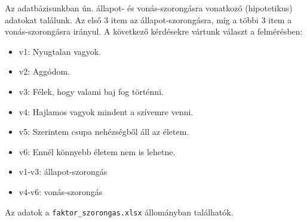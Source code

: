 \documentclass[
  letterpaper,
]{krantz}
\makeatletter
\newenvironment{Shaded}{\begin{snugshade}}{\end{snugshade}}
\newcommand{\CommentTok}[1]{\textcolor[rgb]{0.37,0.37,0.37}{#1}}
\newcommand{\FunctionTok}[1]{\textcolor[rgb]{0.28,0.35,0.67}{#1}}
\newcommand{\NormalTok}[1]{\textcolor[rgb]{0.00,0.23,0.31}{#1}}
\newcommand{\OtherTok}[1]{\textcolor[rgb]{0.00,0.23,0.31}{#1}}
\newcommand{\SpecialCharTok}[1]{\textcolor[rgb]{0.37,0.37,0.37}{#1}}
\newcommand{\StringTok}[1]{\textcolor[rgb]{0.13,0.47,0.30}{#1}}
\newenvironment{kframe}{%
\medskip{}
\setlength{\fboxsep}{.8em}
 \def\at@end@of@kframe{}%
 \ifinner\ifhmode%
  \def\at@end@of@kframe{\end{minipage}}%
  \begin{minipage}{\columnwidth}%
 \fi\fi%
 \def\FrameCommand##1{\hskip\@totalleftmargin \hskip-\fboxsep
 \colorbox{shadecolor}{##1}\hskip-\fboxsep
     \hskip-\linewidth \hskip-\@totalleftmargin \hskip\columnwidth}%
 \MakeFramed {\advance\hsize-\width
   \@totalleftmargin\z@ \linewidth\hsize
   \@setminipage}}%
 {\par\unskip\endMakeFramed%
 \at@end@of@kframe}
\renewenvironment{Shaded}{\begin{kframe}}{\end{kframe}}
\makeatother
\begin{document}
Az adatbázisunkban ún. állapot- és vonás-szorongásra vonatkozó
(hipotetikus) adatokat találunk. Az első 3 item az állapot-szorongásra,
míg a többi 3 item a vonás-szorongásra irányul. A következő kérdésekre
vártunk választ a felmérésben:

\begin{itemize}
\item
  v1: Nyugtalan vagyok.
\item
  v2: Aggódom.
\item
  v3: Félek, hogy valami baj fog történni.
\item
  v4: Hajlamos vagyok mindent a szívemre venni.
\item
  v5: Szerintem csupa nehézségből áll az életem.
\item
  v6: Ennél könnyebb életem nem is lehetne.
\item
  v1-v3: állapot-szorongás
\item
  v4-v6: vonás-szorongás
\end{itemize}

Az adatok a \texttt{faktor\_szorongas.xlsx} állományban találhatók.

\begin{Shaded}
\end{Shaded}
\end{document}
